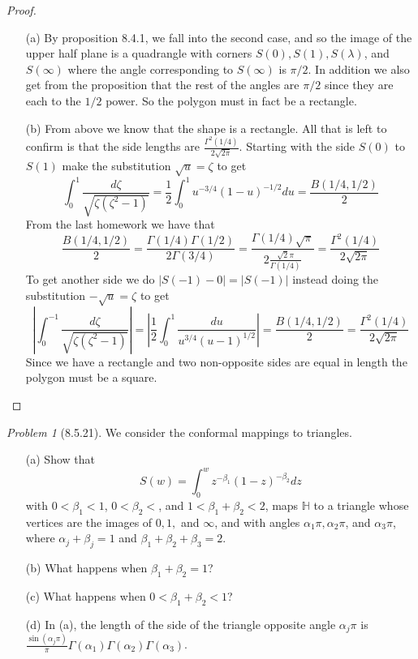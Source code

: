 \documentclass[10pt]{article}
\newcommand{\sk}{\vskip 10mm}
\newcommand{\bb}[1]{\mathbb{#1}}
\theoremstyle{remark}
\newtheorem{problem}{Problem}
\theoremstyle{remark}
\begin{document}
\begin{proof}
  \begin{enumerate}
  \item[(a)] By proposition 8.4.1, we fall into the second case, and so the
    image of the upper half plane is a quadrangle with corners $S(0),S(1),S(\lambda)$, and
    $S(\infty)$ where the angle corresponding to $S(\infty)$ is $\pi/2$. In addition we also get
    from the proposition that the rest of the angles are $\pi/2$ since they are each to
    the $1/2$ power. So the polygon must in fact be a rectangle.
  \item[(b)] From above we know that the shape is a rectangle. All that is left
    to confirm is that the side lengths are $\frac{\Gamma^2(1/4)}{2\sqrt{2\pi}}$.
    Starting with the side $S(0)$ to $S(1)$ make the substitution $\sqrt{u}=\zeta$ to get
    \[
      \int_0^1\frac{d\zeta}{\sqrt{\zeta(\zeta^2-1)}}=\frac{1}{2}\int_0^1u^{-3/4}(1-u)^{-1/2}du = \frac{B(1/4,1/2)}{2}
    \]
    From the last homework we have that
    \[
      \frac{B(1/4,1/2)}{2}=\frac{\Gamma(1/4)\Gamma(1/2)}{2\Gamma(3/4)}=\frac{\Gamma(1/4)\sqrt{\pi}}{2\frac{\sqrt{2}\pi}{\Gamma(1/4)}}=\frac{\Gamma^2(1/4)}{2\sqrt{2\pi}}
    \]
    To get another side we do $|S(-1)-0|=|S(-1)|$ instead doing the substitution $-\sqrt{u}=\zeta$ to get
    \[
      |\int_0^{-1}\frac{d\zeta}{\sqrt{\zeta(\zeta^2-1)}}| = |\frac{1}{2}\int_0^1\frac{du}{u^{3/4}(u-1)^{1/2}}|=\frac{B(1/4,1/2)}{2}=\frac{\Gamma^2(1/4)}{2\sqrt{2\pi}}
    \]
    Since we have a rectangle and two non-opposite sides are equal in length
    the polygon must be a square.
  \end{enumerate}
\end{proof}

\sk

\begin{problem}[8.5.21]
  We consider the conformal mappings to triangles.
  \begin{enumerate}
  \item[(a)] Show that
    \[
      S(w)=\int_0^w z^{-\beta_1}(1-z)^{-\beta_2}dz
    \]
    with $0<\beta_1<1$, $0<\beta_2<$, and $1<\beta_1+\beta_2<2$, maps $\bb{H}$
    to a triangle whose vertices are the images of $0,1,$ and
    $\infty$, and with angles $\alpha_1\pi,\alpha_2\pi$, and $\alpha_3\pi$,
    where $\alpha_j+\beta_j=1$ and $\beta_1+\beta_2+\beta_3=2$.
  \item[(b)] What happens when $\beta_1+\beta_2=1$?
  \item[(c)] What happens when $0<\beta_1+\beta_2<1$?
  \item[(d)] In (a), the length of the side of the triangle opposite angle
    $\alpha_j\pi$ is
    $\frac{\sin(\alpha_j\pi)}{\pi}\Gamma(\alpha_1)\Gamma(\alpha_2)\Gamma(\alpha_3)$.
  \end{enumerate}
\end{problem}
\end{document}
